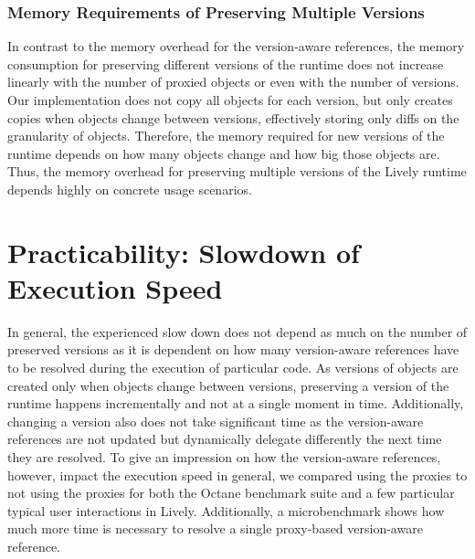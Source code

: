 \subsubsection{Memory Requirements of Preserving Multiple Versions}

In contrast to the memory overhead for the version-aware references, the memory consumption for preserving different versions of the runtime does not increase linearly with the number of proxied objects or even with the number of versions.
Our implementation does not copy all objects for each version, but only creates copies when objects change between versions, effectively storing only diffs on the granularity of objects.
Therefore, the memory required for new versions of the runtime depends on how many objects change and how big those objects are.
Thus, the memory overhead for preserving multiple versions of the Lively runtime depends highly on concrete usage scenarios.





\section{Practicability: Slowdown of Execution Speed} \label{sec:DISCUSSION:3}



In general, the experienced slow down does not depend as much on the number of preserved versions as it is dependent on how many version-aware references have to be resolved during the execution of particular code.
As versions of objects are created only when objects change between versions, preserving a version of the runtime happens incrementally and not at a single moment in time.
Additionally, changing a version also does not take significant time as the version-aware references are not updated but dynamically delegate differently the next time they are resolved.
To give an impression on how the version-aware references, however, impact the execution speed in general, we compared using the proxies to not using the proxies for both the Octane benchmark suite and a few particular typical user interactions in Lively.
Additionally, a microbenchmark shows how much more time is necessary to resolve a single proxy-based version-aware reference.


